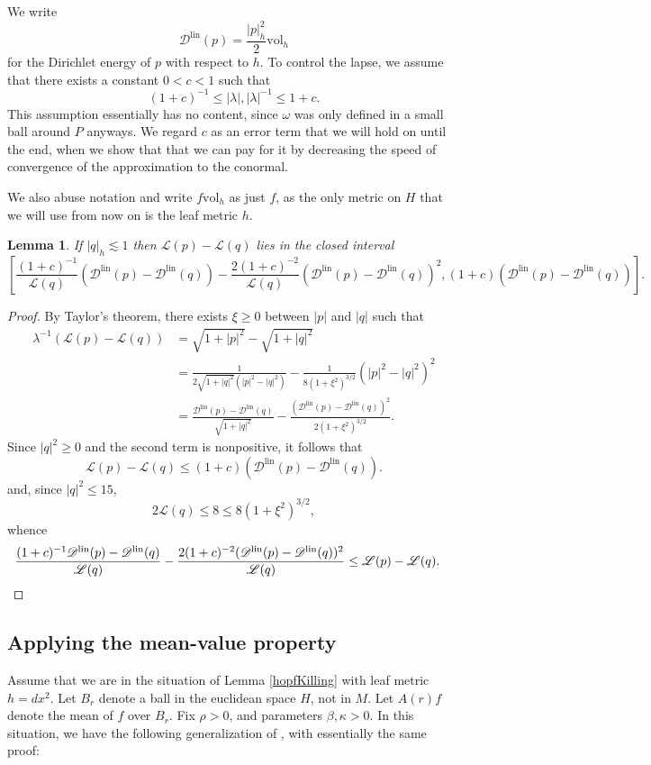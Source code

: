\documentclass[reqno,12pt,letterpaper]{amsart}
\newcommand{\Lagrange}{\mathscr L}
\newcommand{\DirL}{\mathscr D^{\mathrm{lin}}}
\newcommand{\vol}{\mathrm{vol}}
\newtheorem{lemma}[theorem]{Lemma}
\theoremstyle{definition}
\numberwithin{equation}{section}
\begin{document}
We write
$$\DirL(p) = \frac{|p|_h^2}{2}\vol_h$$
for the Dirichlet energy of $p$ with respect to $h$.
To control the lapse, we assume that there exists a constant $0 < c < 1$ such that
$$(1 + c)^{-1} \leq |\lambda|, |\lambda|^{-1} \leq 1 + c.$$
This assumption essentially has no content, since $\omega$ was only defined in a small ball around $P$ anyways.
We regard $c$ as an error term that we will hold on until the end, when we show that that we can pay for it by decreasing the speed of convergence of the approximation to the conormal.

We also abuse notation and write $f\vol_h$ as just $f$, as the only metric on $H$ that we will use from now on is the leaf metric $h$.

\begin{lemma}\label{Taylor lemma}
If $|q|_h \lesssim 1$ then $\Lagrange(p) - \Lagrange(q)$ lies in the closed interval
$$\left[\frac{(1 + c)^{-1}}{\Lagrange(q)}(\DirL(p) - \DirL(q)) - \frac{2(1 + c)^{-2}}{\Lagrange(q)}(\DirL(p) - \DirL(q))^2, (1 + c)(\DirL(p) - \DirL(q))\right].$$
\end{lemma}
\begin{proof}
By Taylor's theorem, there exists $\xi \geq 0$ between $|p|$ and $|q|$ such that
\begin{align*}
\lambda^{-1}(\Lagrange(p) - \Lagrange(q)) &= \sqrt{1 + |p|^2} - \sqrt{1 + |q|^2}\\
&= \frac{1}{2 \sqrt{1 + |q|^2}(|p|^2 - |q|^2)} - \frac{1}{8(1 + \xi^2)^{3/2}}(|p|^2 - |q|^2)^2 \\
&= \frac{\DirL(p) - \DirL(q)}{\sqrt{1 + |q|^2}} - \frac{(\DirL(p) - \DirL(q))^2}{2(1 + \xi^2)^{3/2}}.
\end{align*}
Since $|q|^2 \geq 0$ and the second term is nonpositive, it follows that
$$\Lagrange(p) - \Lagrange(q) \leq (1 + c)(\DirL(p) - \DirL(q)).$$
and, since $|q|^2 \leq 15$,
$$2\Lagrange(q) \leq 8 \leq 8(1 + \xi^2)^{3/2},$$
whence
\begin{align*}
\frac{(1 + c)^{-1}\DirL(p) - \DirL(q)}{\Lagrange(q)} - \frac{2(1 + c)^{-2}(\DirL(p) - \DirL(q))^2}{\Lagrange(q)} &\leq \Lagrange(p) - \Lagrange(q).\qedhere
\end{align*}
\end{proof}

\subsection{Applying the mean-value property}
Assume that we are in the situation of Lemma \ref{hopfKilling} with leaf metric $h = dx^2$.
Let $B_r$ denote a ball in the euclidean space $H$, not in $M$.
Let $A(r)f$ denote the mean of $f$ over $B_r$.
Fix $\rho > 0$, and parameters $\beta, \kappa > 0$.
In this situation, we have the following generalization of \cite[Teorema 4.3]{Miranda66}, with essentially the same proof:
\end{document}
